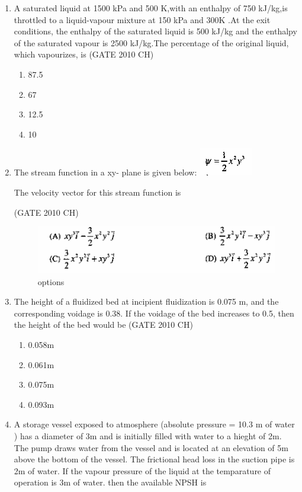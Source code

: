 \documentclass[journal,12pt,onecolumn]{exam}
\theoremstyle{remark}
\begin{document}
\begin{enumerate}
\begin{enumerate}
 \end{enumerate}
\item 
  A saturated liquid at 1500 kPa and 500 K,with an enthalpy of 750 kJ/kg,is throttled to a liquid-vapour mixture at 150 kPa and 300K .At the exit conditions, the enthalpy of the saturated liquid is 500 kJ/kg and the enthalpy of the saturated vapour is 2500 kJ/kg.The percentage of the original liquid, which vapourizes, is
 \hfill{(GATE 2010 CH)}\\

 \begin{enumerate}
     \item 87.5%
     \item 67%
     \item 12.5%
     \item 10%
     
 \end{enumerate}
\item 
   The stream function in a xy- plane is given below:
 \includegraphics[width=0.125\linewidth]{figs/Q.19 image.png}

   The velocity vector for this stream function is

   \hfill{(GATE 2010 CH)}\\

  \begin{figure}[H]
      \centering
      \includegraphics[width=1.0\linewidth]{figs/Q.19 options.png}
      \caption{options}
      \label{fig:figs/Q.19 options.png}
  \end{figure}
\item 
   The height of a fluidized bed at incipient fluidization is 0.075 m, and the corresponding voidage is 0.38. If the voidage of the bed increases to 0.5, then the height of the bed would be
\hfill{(GATE 2010 CH)}\\

\begin{enumerate}
    \item 0.058m
    \item 0.061m
    \item 0.075m
    \item 0.093m
\end{enumerate}
\item
   A storage vessel exposed to atmosphere (absolute pressure = 10.3 m of water ) has a diameter of 3m and is initially filled with water to a hieght of 2m. The pump draws water from the vessel and is located at an elevation of 5m above the bottom of the vessel. The frictional head loss in the suction pipe is 2m of water. If the vapour pressure of the liquid at the temparature of operation is 3m of water. then the available NPSH is


\end{enumerate}
\end{document}
